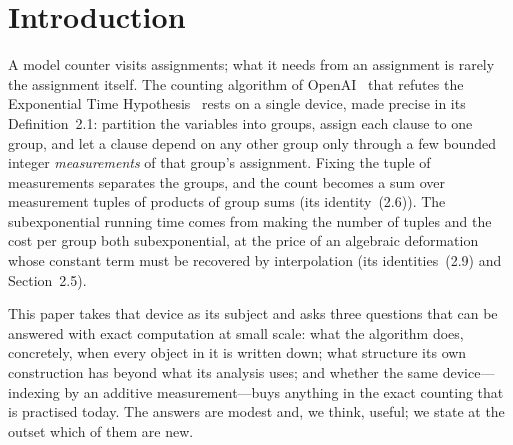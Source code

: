 \documentclass[11pt]{article}
\theoremstyle{definition}
\theoremstyle{remark}
\begin{document}
\section{Introduction}

A model counter visits assignments; what it needs from an assignment is rarely the assignment itself. The counting algorithm of OpenAI~\citep{OpenAI26} that refutes the Exponential Time Hypothesis~\citep{IP01,IPZ01} rests on a single device, made precise in its Definition~2.1: partition the variables into groups, assign each clause to one group, and let a clause depend on any other group only through a few bounded integer \emph{measurements} of that group's assignment. Fixing the tuple of measurements separates the groups, and the count becomes a sum over measurement tuples of products of group sums (its identity~(2.6)). The subexponential running time comes from making the number of tuples and the cost per group both subexponential, at the price of an algebraic deformation whose constant term must be recovered by interpolation (its identities~(2.9) and Section~2.5).

This paper takes that device as its subject and asks three questions that can be answered with exact computation at small scale: what the algorithm does, concretely, when every object in it is written down; what structure its own construction has beyond what its analysis uses; and whether the same device---indexing by an additive measurement---buys anything in the exact counting that is practised today. The answers are modest and, we think, useful; we state at the outset which of them are new.
\end{document}
